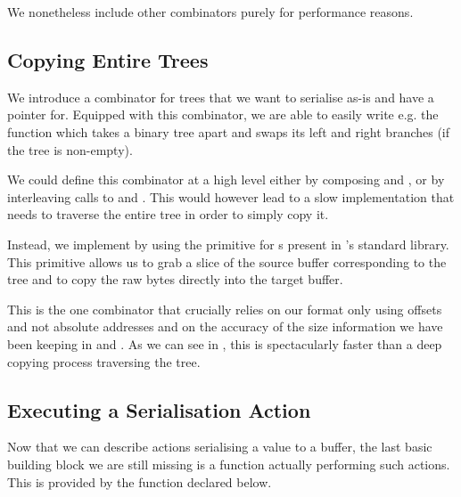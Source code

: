 
We nonetheless include other combinators purely for performance reasons.

\subsection{Copying Entire Trees}

We introduce a  combinator for trees that we want to
serialise as-is and have a pointer for.
%
Equipped with this combinator, we are able to easily write e.g.
the  function which takes a binary tree apart
and swaps its left and right branches (if the tree is non-empty).


We could define this  combinator at a high level
either by composing
 and ,
or by interleaving calls to  and \IdrisFunction{(\#)}.
%
This would however lead to a slow implementation that needs to
traverse the entire tree in order to simply copy it.

Instead, we implement  by using the
 primitive for s
present in \idris{}'s standard library.
%
This primitive allows us to grab a slice of the source buffer
corresponding to the tree
and to copy the raw bytes directly into the target buffer.


This is the one combinator that crucially relies
on our format only using offsets and not absolute addresses
and on the accuracy of the size information we have been keeping
in  and .
%
As we can see in , this is spectacularly faster than
a deep copying process traversing the tree.

\subsection{Executing a Serialisation Action}

Now that we can describe actions serialising a value to a buffer,
the last basic building block we are still missing is a function actually
performing such actions.
%
This is provided by the  function
declared below.

